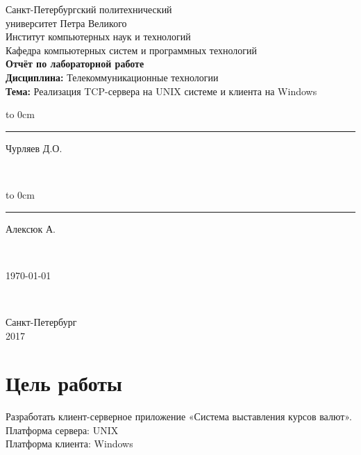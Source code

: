 \documentclass[10pt,a4paper,oneside]{article}
\begin{document}
	\begin{titlepage}
		\newpage
		\begin{center} %
			Санкт-Петербургский политехнический\\ 
			университет Петра Великого\\
			Институт компьютерных наук и технологий\\
			Кафедра компьютерных систем и программных технологий\\
			\vspace{7cm}
			\textbf {Отчёт по лабораторной работе}\\
			\textbf {Дисциплина:} Телекоммуникационные технологии\\
			\textbf{Тема:} Реализация TCP-сервера на UNIX системе и клиента на Windows
		\end{center} %
		\vspace{8cm} %
		
		\vfill
		
		\hfill\parbox{9 cm}{\hspace*{3cm}\hbox to 0cm{\raisebox{-1em}{\small(подпись)}}\hspace*{-0.8cm}\rule{3cm}{0.8pt}Чурляев Д.О.}\\[0.6cm]
		
		 \hfill\parbox{9 cm}{\hspace*{3cm}\hbox to 0cm{\raisebox{-1em}{\small(подпись)}}\hspace*{-0.8cm}\rule{3cm}{0.8pt} Алексюк А. }\\[0.6cm]
		
		\hfill\parbox{9 cm}{\hspace*{5cm} \today }\\[0.6cm]
		\vspace{\fill}
		\begin{center}
			Санкт-Петербург \\ 2017
		\end{center}
	\end{titlepage}
	
\newpage
\section{Цель работы}

Разработать клиент-серверное приложение «Система выставления курсов валют».\\
Платформа сервера: UNIX\\
Платформа клиента: Windows\\
\end{document}
